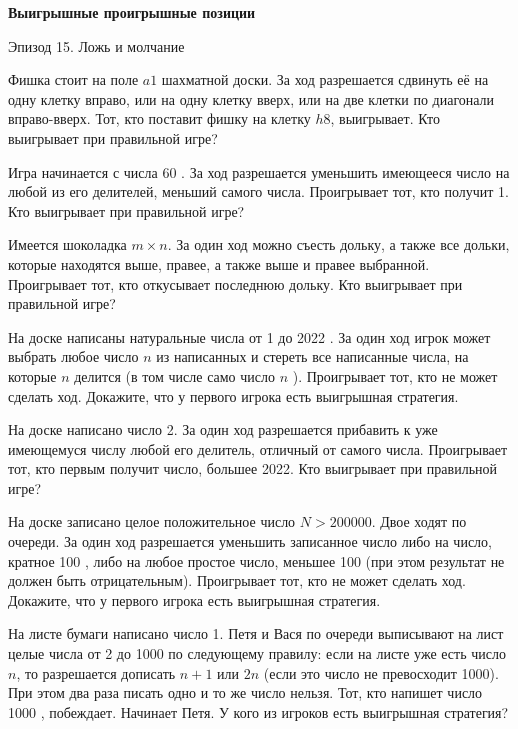 \centerline{\bf \Huge Выигрышные проигрышные позиции}

\begin{flushright}
        \scriptsize{Эпизод 15. Ложь и молчание}
\end{flushright}

Фишка стоит на поле $a 1$ шахматной доски. За ход разрешается сдвинуть её на одну клетку вправо, или на одну клетку вверх, или на две клетки по диагонали вправо-вверх. Тот, кто поставит фишку на клетку $h 8$, выигрывает. Кто выигрывает при правильной игре?

Игра начинается с числа 60 . За ход разрешается уменьшить имеющееся число на любой из его делителей, меньший самого числа. Проигрывает тот, кто получит 1. Кто выигрывает при правильной игре?

Имеется шоколадка $m \times n$. За один ход можно съесть дольку, а также все дольки, которые находятся выше, правее, а также выше и правее выбранной. Проигрывает тот, кто откусывает последнюю дольку. Кто выигрывает при правильной игре?

На доске написаны натуральные числа от 1 до 2022 . За один ход игрок может выбрать любое число $n$ из написанных и стереть все написанные числа, на которые $n$ делится (в том числе само число $n$ ). Проигрывает тот, кто не может сделать ход. Докажите, что у первого игрока есть выигрышная стратегия.

На доске написано число 2. За один ход разрешается прибавить к уже имеющемуся числу любой его делитель, отличный от самого числа. Проигрывает тот, кто первым получит число, большее 2022. Кто выигрывает при правильной игре?

На доске записано целое положительное число $N>200000$. Двое ходят по очереди. За один ход разрешается уменьшить записанное число либо на число, кратное 100 , либо на любое простое число, меньшее 100 (при этом результат не должен быть отрицательным). Проигрывает тот, кто не может сделать ход. Докажите, что у первого игрока есть выигрышная стратегия.

На листе бумаги написано число 1. Петя и Вася по очереди выписывают на лист целые числа от 2 до 1000 по следующему правилу: если на листе уже есть число $n$, то разрешается дописать $n+1$ или $2 n$ (если это число не превосходит 1000). При этом два раза писать одно и то же число нельзя. Тот, кто напишет число 1000 , побеждает. Начинает Петя. У кого из игроков есть выигрышная стратегия?